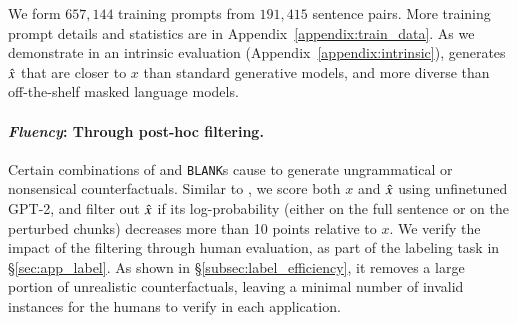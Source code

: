 We form $657,144$ training prompts from $191,415$ sentence pairs. 
More training prompt details and \tagstrshort statistics are in Appendix~\ref{appendix:train_data}.
As we demonstrate in an intrinsic evaluation (Appendix~\ref{appendix:intrinsic}), \sysname generates $\hat{x}$ that are closer to $x$ than standard generative models, and more diverse than off-the-shelf masked language models.





\paragraph{\emph{Fluency}: Through post-hoc filtering.}
Certain combinations of \tagstrs and \texttt{BLANK}s cause \sysname to generate ungrammatical or nonsensical counterfactuals. 
Similar to \citet{morris2020textattack}, we score both $x$ and $\hat{x}$ using unfinetuned GPT-2, and filter out $\hat{x}$ if its log-probability (either on the full sentence or on the perturbed chunks) decreases more than 10 points relative to $x$.
We verify the impact of the filtering through human evaluation, as part of the labeling task in \S\ref{sec:app_label}.
As shown in \S\ref{subsec:label_efficiency}, it removes a large portion of unrealistic counterfactuals, leaving a minimal number of invalid instances for the humans to verify in each application.









